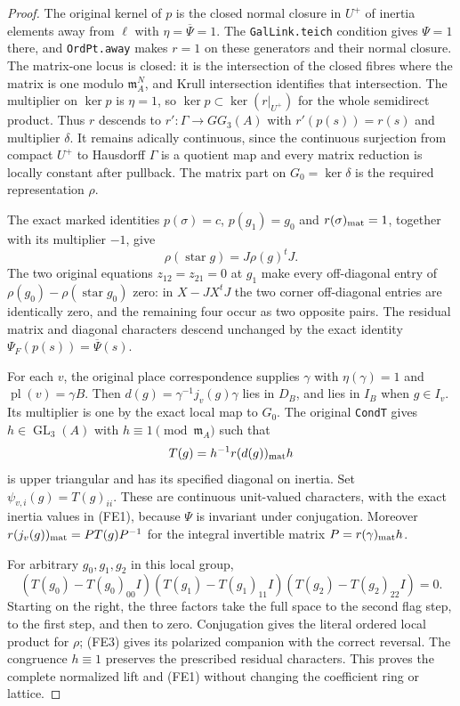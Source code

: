 \begin{proof}
The original kernel of $p$ is the closed normal closure in $U^+$
of inertia elements away from $\ell$ with $\eta=\overline\Psi=1$.
The \texttt{GalLink.teich} condition gives $\Psi=1$ there, and
\texttt{OrdPt.away} makes $r=1$ on these generators and their
normal closure.  The matrix-one locus is closed: it is the
intersection of the closed fibres where the matrix is one modulo
$\mathfrak m_A^N$, and Krull intersection identifies that
intersection.  The multiplier on $\ker p$ is $\eta=1$, so
$\ker p\subset\ker(r|_{U^+})$ for the whole semidirect product.
Thus $r$ descends to $r':\Gamma\to GG_3(A)$ with
$r'(p(s))=r(s)$ and multiplier $\delta$.  It remains adically
continuous, since the continuous surjection from compact $U^+$
to Hausdorff $\Gamma$ is a quotient map and every matrix reduction
is locally constant after pullback.  The matrix part on
$G_0=\ker\delta$ is the required representation $\rho$.

The exact marked identities $p(\sigma)=c$, $p(g_1)=g_0$ and
$r(\sigma)_{\rm mat}=1$, together with its multiplier $-1$, give
\[
 \rho(\operatorname{star}g)=J\rho(g)^tJ.                    \tag{FE3}
\]
The two original equations $z_{12}=z_{21}=0$ at $g_1$ make every
off-diagonal entry of $\rho(g_0)-\rho(\operatorname{star}g_0)$
zero: in $X-JX^tJ$ the two corner off-diagonal entries are
identically zero, and the remaining four occur as two opposite
pairs.  The residual matrix and diagonal characters descend
unchanged by the exact identity
$\Psi_F(p(s))=\overline\Psi(s)$.

For each $v$, the original place correspondence supplies
$\gamma$ with $\eta(\gamma)=1$ and $\operatorname{pl}(v)=\gamma B$.
Then $d(g)=\gamma^{-1}j_v(g)\gamma$ lies in $D_B$, and lies in
$I_B$ when $g\in I_v$.  Its multiplier is one by the exact
local map to $G_0$.  The original \texttt{CondT} gives
$h\in\operatorname{GL}_3(A)$ with $h\equiv1\pmod{\mathfrak m_A}$
such that
\[
 T(g)=h^{-1}r(d(g))_{\rm mat}h
\]
is upper triangular and has its specified diagonal on inertia.
Set $\psi_{v,i}(g)=T(g)_{ii}$.  These are continuous unit-valued
characters, with the exact inertia values in (FE1), because
$\Psi$ is invariant under conjugation.  Moreover
$r(j_v(g))_{\rm mat}=PT(g)P^{-1}$ for the integral invertible
matrix $P=r(\gamma)_{\rm mat}h$.

For arbitrary $g_0,g_1,g_2$ in this local group,
\[
 (T(g_0)-T(g_0)_{00}I)(T(g_1)-T(g_1)_{11}I)
                         (T(g_2)-T(g_2)_{22}I)=0.          \tag{FE4}
\]
Starting on the right, the three factors take the full space to
the second flag step, to the first step, and then to zero.
Conjugation gives the literal ordered local product for $\rho$;
(FE3) gives its polarized companion with the correct reversal.
The congruence $h\equiv1$ preserves the prescribed residual
characters.  This proves the complete normalized lift and (FE1)
without changing the coefficient ring or lattice.


\end{proof}
